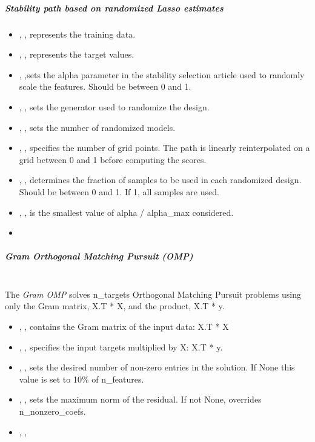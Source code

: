 \subparagraph{Stability path based on randomized Lasso estimates}
\mbox{}
\begin{itemize}
  \item {}, , represents the training data.
  \item {}, , represents the
  target values.
  \item {}, ,sets the alpha
  parameter in the stability selection article used to randomly scale the
  features. 
  Should be between 0 and 1.
  \item {}, , sets the generator used to randomize the
  design.
  \item {}, , sets the number of
  randomized models.
  \item {}, , specifies the number of grid
  points.
  The path is linearly reinterpolated on a grid between 0 and 1 before computing
  the scores.
  \item {}, , determines the
  fraction of samples to be used in each randomized design.
  Should be between 0 and 1.
  If 1, all samples are used.
  \item {}, , is the smallest value of 
  alpha / alpha\_max considered.
  \item \verDescriptionB
\end{itemize}

\subparagraph{Gram Orthogonal Matching Pursuit (OMP)}
\mbox{}
\\The \textit{Gram OMP} solves n\_targets Orthogonal Matching Pursuit problems
using only the Gram matrix, X.T * X, and the product, X.T * y.
%
\begin{itemize}
  \item {}, , 
  contains the Gram matrix of the input data: X.T * X
  \item {}, , specifies the input targets multiplied by X:
  X.T * y.
  \item {}, , sets the desired number of
  non-zero entries in the solution.
  If None this value is set to 10\% of n\_features.
  \item {}, , sets the maximum norm of the residual.
  If not None, overrides n\_nonzero\_coefs.
  \item {}, ,
\end{itemize}

